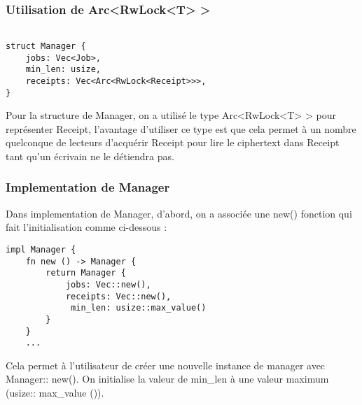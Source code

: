 \documentclass{article}
\begin{document}

\subsubsection{Utilisation de Arc<RwLock<T> > }
\ssubsection
\begin{lstlisting}

struct Manager {
    jobs: Vec<Job>,
    min_len: usize,
    receipts: Vec<Arc<RwLock<Receipt>>>,
}
\end{lstlisting}
Pour la structure de Manager, on a utilisé le type Arc<RwLock<T> > pour représenter Receipt, l'avantage d'utiliser ce type est que cela permet à un nombre quelconque de lecteurs d’acquérir Receipt pour lire le ciphertext dans Receipt tant qu’un écrivain ne le détiendra pas.\\
\subsubsection{Implementation de Manager}
Dans implementation de Manager, d'abord, on a associée une new() fonction qui fait l'initialisation comme ci-dessous : 
\begin{lstlisting}
impl Manager {
    fn new () -> Manager {
        return Manager {
            jobs: Vec::new(),
            receipts: Vec::new(),
             min_len: usize::max_value()
        }
    }
    ...
\end{lstlisting}
Cela permet à l'utilisateur de créer une nouvelle instance de manager avec Manager:: new().
On initialise la valeur de min\_len à une valeur maximum (usize:: max\_value ()).\\
\end{document}
